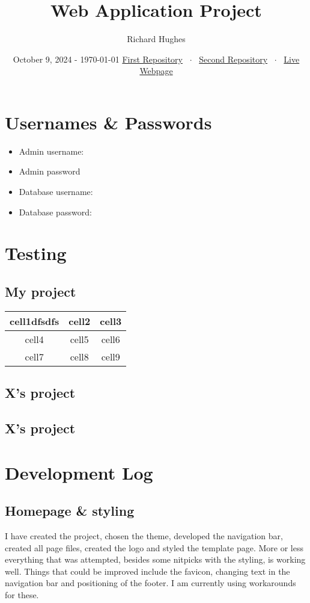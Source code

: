 \documentclass{article}
\title{Web Application Project}
\author{Richard Hughes}
\date{October 9, 2024 - \today\endgraf
\vspace{5mm}
\href{https://github.com/richardh05/Web-Application-Development-J110823}{First Repository} ~$\cdot$~
\href{https://github.com/richardh05/Carlos-Pizza}{Second Repository} ~$\cdot$~
\href{http://2326227.win.studentwebserver.co.uk/CO5027}{Live Webpage}
}
\begin{document}
\maketitle
\newpage
\section*{Usernames \& Passwords}
\begin{itemize}
  \item Admin username:
  \item Admin password
  \item Database username:
  \item Database password:
  \end{itemize}
\tableofcontents
\newpage


\section{Testing}
  \subsection{My project}
  \begin{center}
    \begin{tabular}{|c|c|c|}
      \hline
      cell1dfsdfs & cell2 & cell3 \\
      \hline 
      cell4 & cell5 & cell6 \\  
      cell7 & cell8 & cell9 \\ 
      \hline
    \end{tabular}
    \end{center}
  \subsection{X's project}
  \subsection{X's project}


\section{Development Log}
  \subsection{Homepage \& styling}
    I have created the project, chosen the theme, developed the navigation bar, created all page files, created the logo and styled the template page. More or less everything that was attempted, besides some nitpicks with the styling, is working well. Things that could be improved include the favicon, changing text in the navigation bar and positioning of the footer. I am currently using workarounds for these. \cite{CarlosCSS}
\end{document}
